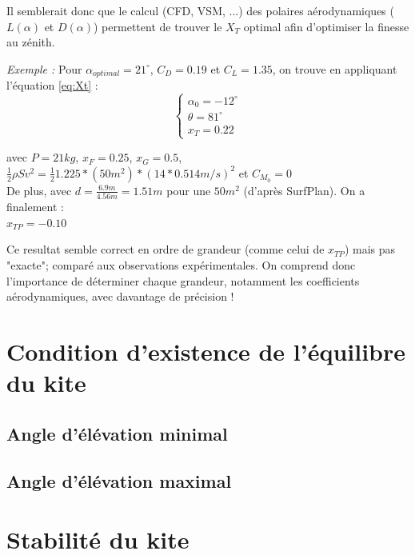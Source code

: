 \documentclass[conference]{IEEEtran}
\begin{document}
Il semblerait donc que le calcul (CFD, VSM, ...) des polaires aérodynamiques ($L(\alpha)$ et $D(\alpha)$) permettent de trouver le $X_T$ optimal afin d'optimiser la finesse au zénith. 

\textit{Exemple : }
Pour $\alpha_{optimal} = 21^\circ$, $C_D = 0.19$ et $C_L = 1.35$, on trouve en appliquant l'équation \ref{eq:Xt} : \\

\begin{equation}
    \begin{cases}
    \alpha_0 =  -12^\circ\\
    \theta = 81^\circ\\
    x_T = 0.22
    \end{cases}
    \label{eq:Xt results}
\end{equation}

avec $P = 21 kg$, $x_F = 0.25$, $x_G = 0.5$,$\frac{1}{2} \rho S v^2 = \frac{1}{2} 1.225 * (50m^2) * (14 * 0.514 m/s)^2$  et $C_{M_0} = 0$ \\

De plus, avec  $d = \frac{6.9 m}{4.56 m} = 1.51 m$ pour une $50m^2$ (d'après SurfPlan). On a finalement :\\
$x_{TP} = -0.10 $

Ce resultat semble correct en ordre de grandeur (comme celui de $x_{TP}$) mais pas "exacte"; comparé aux observations expérimentales. On comprend donc l'importance de déterminer chaque grandeur, notamment les coefficients aérodynamiques, avec davantage de précision !


\IEEEpeerreviewmaketitle
\section{Condition d'existence de l'équilibre du kite }

\subsection{Angle d'élévation minimal} 


\subsection{Angle d'élévation maximal}

\section{Stabilité du kite }
\end{document}
